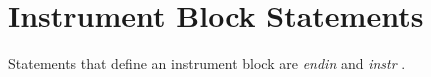 \begin{comment}
\documentclass[10pt]{article}
\usepackage{fullpage, graphicx, url}
\setlength{\parskip}{1ex}
\setlength{\parindent}{0ex}
\title{Instrument Block Statements}



\begin{tabular}{ccc}
The Alternative Csound Reference Manual & & \\
Previous &Syntax of the Orchestra &Next

\end{tabular}

\end{comment}
\section{Instrument Block Statements}


  Statements that define an instrument block are \emph{endin}
 and \emph{instr}
. 


\begin{comment}
\begin{tabular}{lcr}
Previous &Home &Next \\
Orchestra Header Statements &Up &Variable Initialization

\end{tabular}



\end{comment}

